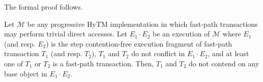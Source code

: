 The formal proof follows.
%
\begin{lemma}
\label{lm:hytm}
%
Let $\mathcal{M}$ be any progressive HyTM implementation in which fast-path transactions may perform trivial
direct accesses.
Let $E_1 \cdot E_2$ be an execution of $\mathcal{M}$ where
$E_1$ (and resp. $E_2$) is the step contention-free
execution fragment of fast-path transaction $T_1$ (and resp. $T_2$),
$T_1$ and $T_2$ do not conflict in $E_1 \cdot E_2$, and
at least one of $T_1$ or $T_2$ is a fast-path transaction. 
Then, $T_1$ and $T_2$ do not contend on any base object in $E_1 \cdot E_2$.
\end{lemma}
%
% 
% 
% 
